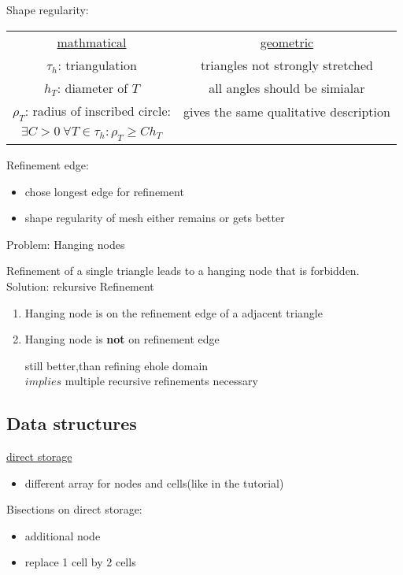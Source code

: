 Shape regularity:\\
\begin{tabular}{c | c}
	\underline{mathmatical} & \underline{geometric}\\
	$\tau_h$:  triangulation & triangles not strongly stretched \\
	$h_T$:  diameter of $T$ & all angles should be \glqq simialar \grqq \\
	$\rho_T$:  radius of inscribed circle:	& gives the same qualitative description\\
	$\exists C > 0\ \forall T \in \tau_h \colon \rho_T \geq C h_T$ & 
\end{tabular}


Refinement edge:
\begin{itemize}
	\item chose longest edge for refinement
	\item shape regularity of mesh either remains or gets better
\end{itemize}

Problem: Hanging nodes

Refinement of a single triangle leads to a hanging node that is forbidden.\\
Solution: rekursive Refinement\\
\begin{enumerate}[label= case \arabic*:]
	\item Hanging node is on the refinement edge of a adjacent triangle
	

	\item Hanging node is \textbf{not} on refinement edge
	
	still better,than refining ehole domain\\
	$implies$ multiple recursive refinements necessary
\end{enumerate}

\subsection{Data structures}
\underline{direct storage}\\
\begin{itemize}
	\item different array for nodes and cells(like in the tutorial)
	
\end{itemize}
Bisections on direct storage:
\begin{itemize}
	\item additional node
	\item replace 1 cell by 2 cells
	
\end{itemize}

